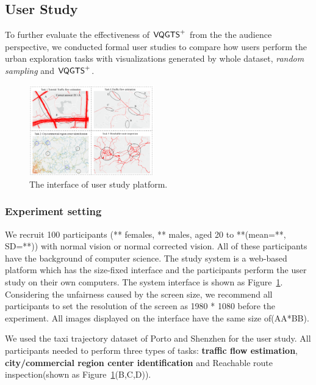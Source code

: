 \subsection{User Study}
To further evaluate the effectiveness of $\mathsf{VQGTS}^{+}$ from the the audience perspective, we conducted formal user studies to compare how users perform the urban exploration tasks with visualizations generated by whole dataset, \textit{random sampling} and $\mathsf{VQGTS}^{+}$.


\begin{figure}[t]
	\centering
	\includegraphics[width=0.48\textwidth]{pictures/user_study/interface.pdf}
	\vspace{-3mm}
	\caption{The interface of user study platform.}
	\vspace{-5mm}
	\label{fig:user_study}
\end{figure}

\subsubsection{Experiment setting}

We recruit 100 participants (** females, ** males, aged 20 to **(mean=**, SD=**)) with normal vision or normal corrected vision. All of these participants have the background of computer science. 
The study system is a web-based platform which has the size-fixed interface and the participants perform the user study on their own  computers. The system interface is shown as Figure~\ref{fig:user_study}. Considering the unfairness caused by the screen size, we recommend all participants to set the resolution of the screen as 1980 * 1080 before the experiment. All images displayed on the interface have the same size of(AA*BB).  

We used the taxi trajectory dataset of Porto and Shenzhen for the user study. All participants needed to perform three types of tasks: \textbf{traffic flow estimation},\textbf{ city/commercial region center identification} and Reachable route inspection(shown as Figure~\ref{fig:user_study}(B,C,D)).

